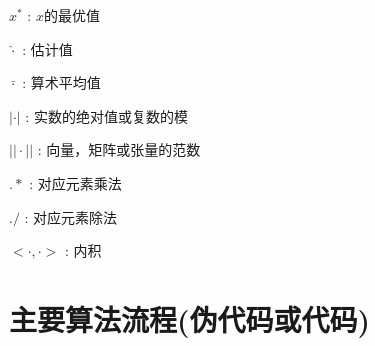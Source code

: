 \documentclass[UTF8,12pt]{ctexart}
\begin{document}
$ x^* $ : \qquad  $x$的最优值

$ \hat{\cdot} $ : \qquad  估计值

$ \bar{\cdot} $ : \qquad 算术平均值

$| \cdot |$ : \qquad 实数的绝对值或复数的模

$|| \cdot ||$ :  \qquad 向量，矩阵或张量的范数

$.*$ : \qquad 对应元素乘法

$./$ : \qquad 对应元素除法

$< \cdot, \cdot >$ : \qquad 内积

\newpage
\section{主要算法流程(伪代码或代码)}



\newpage

%

\end{document}
